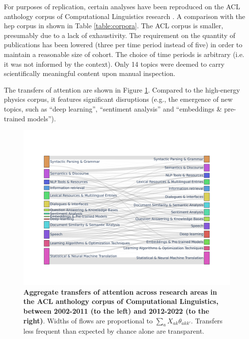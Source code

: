 \documentclass{article}
\begin{document}
For purposes of replication, certain analyses have been reproduced on the ACL anthology corpus of Computational Linguistics research \citep{acl_anthology_corpus}. A comparison with the \gls{hep} corpus in shown in Table \ref{table:corpora}. The ACL corpus is smaller, presumably due to a lack of exhaustivity. The requirement on the quantity of publications has been lowered (three per time period instead of five) in order to maintain a reasonable size of cohort. The choice of time periods is arbitrary (i.e. it was not informed by the context). Only 14 topics were deemed to carry scientifically meaningful content upon manual inspection. 



The transfers of attention are shown in Figure \ref{fig:sankey_acl}. Compared to the high-energy physics corpus, it features significant disruptions (e.g., the emergence of new topics, such as ``deep learning'', ``sentiment analysis'' and ``embeddings \& pre-trained models'').

 \begin{figure}[h]
     \centering
     \includegraphics[width=\textwidth]{plots/Fig17.pdf}
     \caption{\textbf{Aggregate transfers of attention across research areas in the ACL anthology corpus of Computational Linguistics, between 2002-2011 (to the left) and 2012-2022 (to the right)}. Widths of flows are proportional to $\sum_a X_{ak}\theta_{akk'}$. Transfers less frequent than expected by chance alone are transparent. }
     \label{fig:sankey_acl}
 \end{figure}


\end{document}
